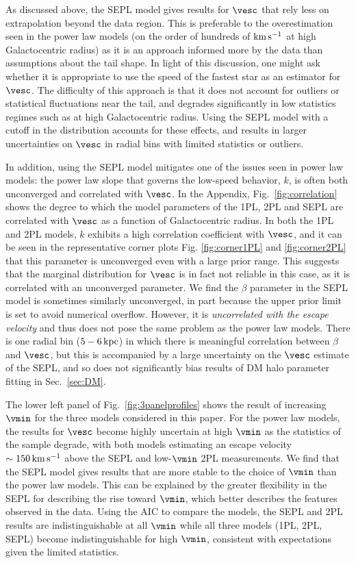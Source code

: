 As discussed above, the SEPL model gives results for $\vesc$ that rely less on extrapolation beyond the data region. This is preferable to the overestimation seen in the power law models (on the order of hundreds of $\rm{km\,s^{-1}}$ at high Galactocentric radius) as it is an approach informed more by the data than assumptions about the tail shape. In light of this discussion, one might ask whether it is appropriate to use the speed of the fastest star as an estimator for $\vesc$. The difficulty of this approach is that it does not account for outliers or statistical fluctuations near the tail, and degrades significantly in low statistics regimes such as at high Galactocentric radius. Using the SEPL model with a cutoff in the distribution accounts for these effects, and results in larger uncertainties on $\vesc$ in radial bins with limited statistics or outliers.

In addition, using the SEPL model mitigates one of the issues seen in power law models: the power law slope that governs the low-speed behavior, $k$, is often both unconverged and correlated with $\vesc$. In the Appendix, Fig.~\ref{fig:correlation} shows the degree to which the model parameters of the 1PL, 2PL and SEPL are correlated with $\vesc$ as a function of Galactocentric radius. In both the 1PL and 2PL models, $k$ exhibits a high correlation coefficient with $\vesc$, and it can be seen in the representative corner plots Fig. \ref{fig:corner1PL} and \ref{fig:corner2PL} that this parameter is unconverged even with a large prior range. This suggests that the marginal distribution for $\vesc$ is in fact not reliable in this case, as it is correlated with an unconverged parameter. We find the $\beta$ parameter in the SEPL model is sometimes similarly unconverged, in part because the upper prior limit is set to avoid numerical overflow. However, it is \textit{uncorrelated with the escape velocity} and thus does not pose the same problem as the power law models. There is one radial bin ($5-6\,\rm{kpc}$) in which there is meaningful correlation between $\beta$ and $\vesc$, but this is accompanied by a large uncertainty on the $\vesc$ estimate of the SEPL, and so does not significantly bias results of DM halo parameter fitting in Sec.~\ref{sec:DM}.

The lower left panel of Fig.~\ref{fig:3panelprofiles} shows the result of increasing $\vmin$ for the three models considered in this paper. For the power law models, the results for $\vesc$ become highly uncertain at high $\vmin$ as the statistics of the sample degrade, with both models estimating an escape velocity $\sim 150\,\rm{km\,s^{-1}}$ above the SEPL and low-$\vmin$ 2PL measurements. 
We find that the SEPL model gives results that are more stable to the choice of $\vmin$ than the power law models. This can be explained by the greater flexibility in the SEPL for describing the rise toward $\vmin$, which better describes the features observed in the data. Using the AIC to compare the models, the SEPL and 2PL results are indistinguishable at all $\vmin$ while all three models (1PL, 2PL, SEPL) become indistinguishable for high $\vmin$, consistent with expectations given the limited statistics. 

